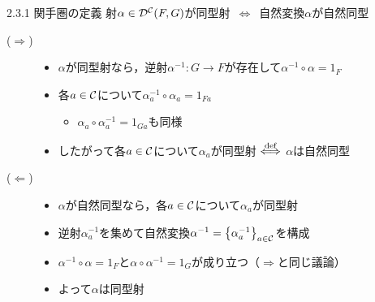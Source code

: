 \documentclass[uplatex,a4paper,dvipdfmx,aspectratio=169,10pt]{beamer}
\begin{document}
\begin{frame}[fragile]{2.3.1 関手圏の定義}
    射$\alpha \in \mathcal{D}^{\mathcal{C}}(F, G)$が同型射\ $\Longleftrightarrow$\ 自然変換$\alpha$が自然同型
    \begin{description}
        \item[($\Rightarrow$)] 
            \begin{itemize}
                \item $\alpha$が同型射なら，逆射$\alpha^{-1} \colon G \to F$が存在して$\alpha^{-1} \circ \alpha = 1_F$
                \item 各$a \in \mathcal{C}$について$\alpha^{-1}_a \circ \alpha_a = 1_{Fa}$
                    \begin{itemize}
                        \item $\alpha_a \circ \alpha^{-1}_a = 1_{Ga}$も同様
                    \end{itemize}
                \item したがって各$a \in \mathcal{C}$について$\alpha_a$が同型射 $\operatorname{\overset{\text{def}}{\Longleftrightarrow}}$ $\alpha$は自然同型
            \end{itemize}
        \item[($\Leftarrow$)]
            \begin{itemize}
                \item $\alpha$が自然同型なら，各$a \in \mathcal{C}$について$\alpha_a$が同型射
                \item 逆射$\alpha^{-1}_a$を集めて自然変換$\alpha^{-1} = \qty{\alpha^{-1}_a}_{a \in \mathcal{C}}$を構成
                \item $\alpha^{-1} \circ \alpha = 1_F$と$\alpha \circ \alpha^{-1} = 1_G$が成り立つ（$\Rightarrow$と同じ議論）
                \item よって$\alpha$は同型射
            \end{itemize}
    \end{description}
\end{frame}
\end{document}
